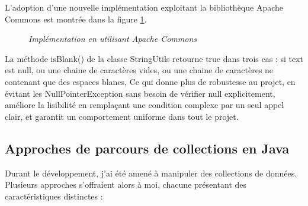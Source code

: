 \documentclass[12pt,a4paper]{report}
\begin{document}
	L'adoption d'une nouvelle implémentation exploitant la bibliothèque Apache Commons est montrée dans la figure \ref{fig:after-string-utils}.
	
	\begin{figure}[H]
		\centering
		\caption{\textit{Implémentation en utilisant Apache Commons}}
		\label{fig:after-string-utils}
	\end{figure}
	
	La méthode isBlank() de la classe StringUtils retourne true dans trois cas : si text est null, ou une chaine de caractères vides, ou une chaine de caractères ne contenant que des espaces blancs, Ce qui donne plus de robustesse au projet, en évitant les NullPointerException sans besoin de vérifier null explicitement, améliore la lisibilité en remplaçant une condition complexe par un seul appel clair, et garantit un comportement uniforme dans tout le projet.
	
	\subsection{Approches de parcours de collections en Java}
	
	Durant le développement, j'ai été amené à manipuler des collections de données. Plusieurs approches s'offraient alors à moi, chacune présentant des caractéristiques distinctes :
	
\end{document}
